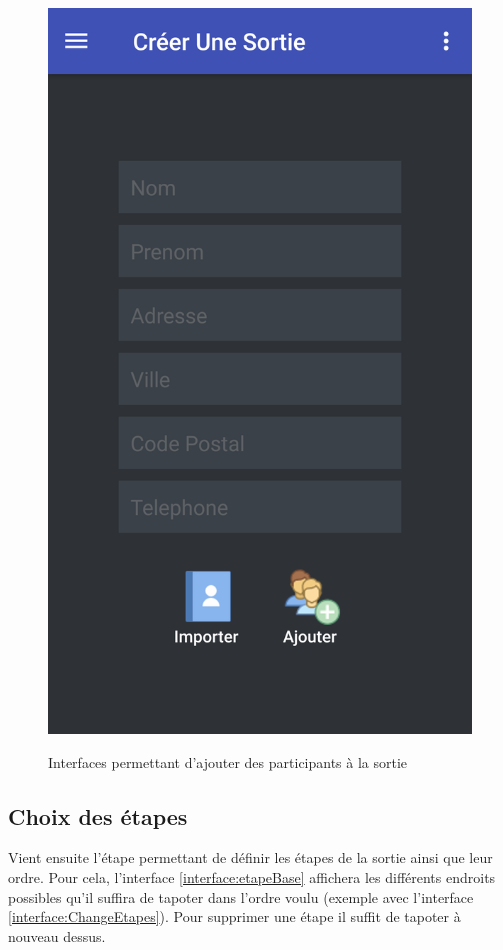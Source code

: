 \documentclass[a4paper, 12pt, notitlepage]{article} %
\begin{document}
\begin{figure}[!htb]
    {\label{interface:newParticipant}\includegraphics[height=0.4\textheight]{Interface_Ajout_Participant.png}}
    \caption[]{Interfaces permettant d'ajouter des participants à la sortie}
    \label{interface:AjoutParticipant}
\end{figure}
\vfill
\clearpage

\subsection{Choix des étapes}
Vient ensuite l'étape permettant de définir les étapes de la sortie ainsi que leur ordre.
Pour cela, l'interface \ref{interface:etapeBase} affichera les différents endroits possibles qu'il suffira de tapoter dans l'ordre voulu (exemple avec l'interface \ref{interface:ChangeEtapes}).
Pour supprimer une étape il suffit de tapoter à nouveau dessus.
\end{document}
